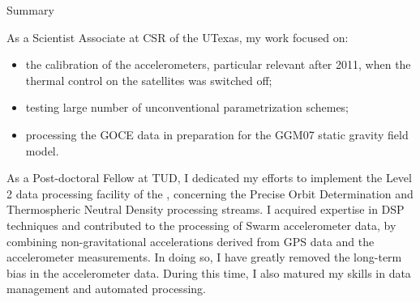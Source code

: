 \begin{cvtext}{Summary}
{%
As a Scientist Associate at \ac{CSR} of the \ac{UTexas}, my work focused on:
\begin{itemize}[topsep=0pt,itemsep=1pt,parsep=0pt,partopsep=0pt]
\item the calibration of the accelerometers, particular relevant after 2011, when the thermal control on the satellites was switched off;
\item testing large number of unconventional parametrization schemes;
\item processing the \ac{GOCE} data in preparation for the GGM07 static gravity field model.
\end{itemize}

As a Post-doctoral Fellow at \ac{TUD}, I dedicated my efforts to implement the Level 2 data processing facility of the , concerning the Precise Orbit Determination and Thermospheric Neutral Density processing streams.
I acquired expertise in \ac{DSP} techniques and contributed to the processing of Swarm accelerometer data, by combining non-gravitational accelerations derived from \ac{GPS} data and the accelerometer measurements.
In doing so, I have greatly removed the long-term bias in the accelerometer data.
During this time, I also matured my skills in data management and automated processing.

}
\end{cvtext}
